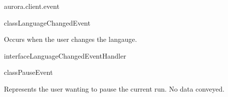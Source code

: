 \begin{texdocpackage}{aurora.client.event}
\begin{texdocclass}{class}{LanguageChangedEvent}
\label{texdoclet:aurora.client.event.LanguageChangedEvent}
\begin{texdocclassintro}
Occurs when the user changes the langauge.\end{texdocclassintro}
\begin{texdocclassfields}
\end{texdocclassfields}
\begin{texdocclassconstructors}
\end{texdocclassconstructors}
\begin{texdocclassmethods}
\end{texdocclassmethods}
\end{texdocclass}


\begin{texdocclass}{interface}{LanguageChangedEventHandler}
\label{texdoclet:aurora.client.event.LanguageChangedEventHandler}
\begin{texdocclassintro}
\end{texdocclassintro}
\begin{texdocclassmethods}
\end{texdocclassmethods}
\end{texdocclass}


\begin{texdocclass}{class}{PauseEvent}
\label{texdoclet:aurora.client.event.PauseEvent}
\begin{texdocclassintro}
Represents the user wanting to pause the current run.
 No data conveyed.\end{texdocclassintro}
\begin{texdocclassfields}
\end{texdocclassfields}
\begin{texdocclassconstructors}
\end{texdocclassconstructors}
\begin{texdocclassmethods}
\end{texdocclassmethods}
\end{texdocclass}



\end{texdocpackage}
